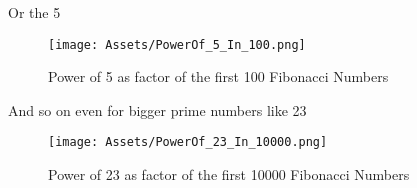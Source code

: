 \documentclass[amsmath,amssymb,aps,pra,reprint,groupedaddress,showpacs]{revtex4-1}
\begin{document}
Or the 5

\begin{figure}[H]
\centering
\texttt{[image: Assets/PowerOf\_5\_In\_100.png]} %
\caption{Power of 5 as factor of the first 100 Fibonacci Numbers}
\end{figure}

And so on even for bigger prime numbers like 23

\begin{figure}[H]
\centering
\texttt{[image: Assets/PowerOf\_23\_In\_10000.png]} %
\caption{Power of 23 as factor of the first 10000 Fibonacci Numbers}
\end{figure}


\begin{comment}

But it's not exactly the same, it seems like the more we increase the base, the less the number appears as a prime factor in Fibonacci Numbers 
(so with an increasing distance between the same exponents), but also this is not true, there are a lot of cases that don't follow the growing rule.

But before getting in a more generic formula, we have to name some things (since they are going to be different for every base).

\begin{enumerate} 
\item $\mathbf{\Gamma}$ will be the base of the prime (or non-prime) number we are taking as example. 
\item $\mathbf{\Omega}$ will be the exponent of base $\Gamma$ of $F(n)$ 
\item $\mathbf{\Delta \Omega}$ will be defined as the distance between the Fibonacci Number before the next equal exponent will appear
\item $\mathbf{F(n)}$ will be the $n_{th}$ Fibonacci Number
\item $\mathbf{\lambda(\Omega, \Gamma)}$ will identify the function that returns the first $n$ where the exponent of the $\Gamma$ base appears in $F(n)$
\item $\mathbf{\lambda_n(\Omega, \Gamma)}$ will, in the same way, be the $n_{th}$ Fibonacci Number where the given exponent for the given base appears
\end{enumerate} 

If we look at FIG. 6 and 7, we have two examples to notice the differences between different bases.
For $\Gamma = 3$ and $\Gamma = 5$ we have $\lambda(1, 3) = 4$ and $\lambda(1, 5) = 6$.
It seems like $\lambda(1, \Gamma) = \Gamma + 1$, but that's wrong: for example, 
for $\Gamma = 11$ we have $\lambda(1, 11) = 10$. For $\Gamma = 13$ it will be $n = 7$. 
So let's have a look at the starting points of the first prime numbers:

\end{comment}
\end{document}
